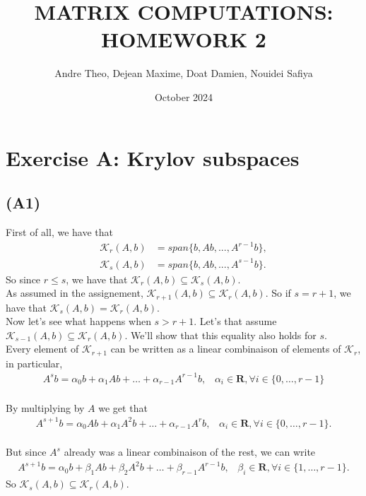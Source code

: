\documentclass{article}
\title{\textbf{MATRIX COMPUTATIONS: HOMEWORK 2}}  %
\author{Andre Theo,
Dejean Maxime,
Doat Damien,
Nouidei Safiya}
\date{October 2024}
\begin{document}
\maketitle

\section{Exercise A: Krylov subspaces}
\subsection*{(A1)}
First of all, we have that 
\begin{align*}
    \mathcal{K}_{r}(A,b) &=span\{b, Ab, ..., A^{r-1}b\},\\
    \mathcal{K}_{s}(A,b) &=span\{b, Ab, ..., A^{s-1}b\}.
\end{align*}
So since $r\leq s$, we have that $\mathcal{K}_r(A,b) \subseteq \mathcal{K}_s(A,b)$.\\

As assumed in the assignement, $\mathcal{K}_{r+1}(A,b) \subseteq \mathcal{K}_{r}(A,b) $.
So if $s=r+1$, we have that $\mathcal{K}_{s}(A,b)=\mathcal{K}_{r}(A,b)$.\\

Now let's see what happens when $s>r+1$. Let's that assume $\mathcal{K}_{s-1}(A,b)\subseteq\mathcal{K}_{r}(A,b)$. We'll show that this equality also holds for $s$.\\

Every element of $\mathcal{K}_{r+1}$ can be written as a linear combinaison of elements of $\mathcal{K}_{r}$, in particular,
\begin{align*}
    A^sb = \alpha_0b +\alpha_1Ab + \dots +\alpha_{r-1} A^{r-1}b, \hspace{10pt} \alpha_i \in \mathbf{R}, \forall i \in \{0,\dots,r-1 \}
\end{align*}\\
By multiplying by $A$ we get that
\begin{align*}
    A^{s+1}b = \alpha_0Ab +\alpha_1A^2b + \dots +\alpha_{r-1} A^{r}b, \hspace{10pt} \alpha_i \in \mathbf{R}, \forall i \in \{0,\dots,r-1 \}.
\end{align*}\\
But since $A^s$ already was a linear combinaison of the rest, we can write
\begin{align*}
    A^{s+1}b = \alpha_0b + \beta_1Ab +\beta_2A^2b + \dots +\beta_{r-1} A^{r-1}b, \hspace{10pt} \beta_i \in \mathbf{R}, \forall i \in \{1,\dots,r-1 \}.
\end{align*}
So $\mathcal{K}_{s}(A,b)\subseteq\mathcal{K}_{r}(A,b)$.\\
\end{document}
